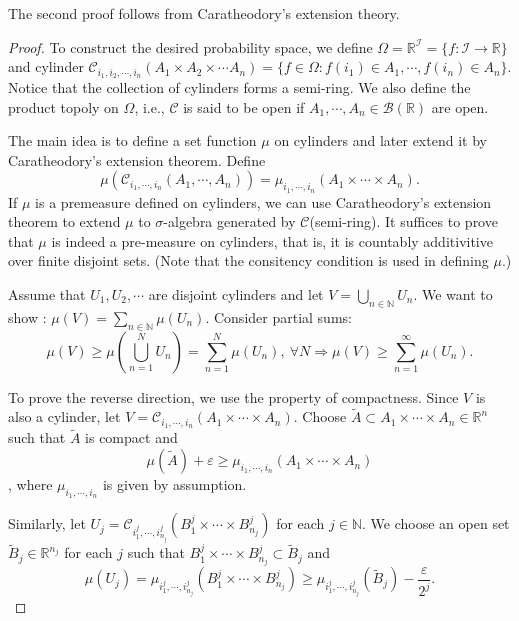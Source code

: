 \documentclass[11pt,english]{smfart}
\newcommand{\mb}{\mathbb}
\newcommand{\mc}{\mathcal}
\begin{document}
The second proof follows from Caratheodory's extension theory. 
\begin{proof}
    To construct the desired probability space, we define $\Omega = \mb{R}^{\mc{I}} = \{f: \mc{I} \rightarrow \mb{R}\}$ and cylinder \underline{$\mc{C}_{i_1,i_2,\cdots,i_n}(A_1\times A_2\times \cdots A_n) = \{f \in \Omega : f(i_1) \in A_1,\cdots, f(i_n) \in A_n\}$}. Notice that the collection of cylinders forms a semi-ring. We also define the product topoly on $\Omega$, i.e., $\mc{C}$ is said to be open if $A_1,\cdots,A_n\in\mc{B}(\mb{R})$ are open. 

    The main idea is to define a set function $\mu$ on cylinders and later extend it by Caratheodory's extension theorem. Define $$\mu\left(\mc{C}_{i_1,\cdots,i_n}(A_1,\cdots, A_n)\right) = \mu_{i_1,\cdots,i_n}(A_1\times \cdots\times A_n).$$  If $\mu$ is a premeasure defined on cylinders, we can use Caratheodory's extension theorem to extend $\mu$ to $\sigma$-algebra generated by $\mc{C}$(semi-ring). It suffices to prove that $\mu$ is indeed a pre-measure on cylinders, that is, it is countably additivitive over finite disjoint sets. (Note that the consitency condition is used in defining $\mu$.)

    Assume that $U_1,U_2,\cdots$ are disjoint cylinders and let $V =\bigcup_{n\in \mb{N}} U_n$. We want to show : $\mu(V) = \sum_{n\in \mb{N}} \mu(U_n)$. Consider partial sums: $$\mu(V) \geq \mu\left(\bigcup_{n=1}^N U_n\right) = \sum_{n=1}^N \mu(U_n), \ \forall N \Rightarrow \mu(V) \geq \sum_{n=1}^\infty \mu(U_n).$$

    To prove the reverse direction, we use the property of compactness. Since $V$ is also a cylinder, let $V = \mc{C}_{i_1,\cdots,i_n}(A_1\times \cdots \times A_n)$. Choose $\tilde{A} \subset A_1\times \cdots\times A_n\in \mb{R}^n$  such that $\tilde{A}$ is compact and $$\mu(\tilde{A}) + \varepsilon \geq \mu_{i_1,\cdots,i_n}(A_1\times \cdots \times A_n)$$, where $\mu_{i_1,\cdots,i_n}$ is given by assumption. 

    Similarly, let $U_j = \mc{C}_{{i_1^j},\cdots,i^j_{n_j}}(B^j_1\times \cdots \times B^j_{n_j})$ for each $j\in \mb{N}$. We choose an open set $\tilde{B}_j \in \mb{R}^{n_j}$ for each $j$ such that  $B^j_1\times \cdots \times B^j_{n_j} \subset \tilde{B}_j $ and $$\mu(U_j) = \mu_{i^j_1,\cdots,i^j_{n_j}}(B_1^j \times \cdots \times B_{n_j}^j) \geq \mu_{i^j_1,\cdots,i^j_{n_j}}(\tilde{B}_j) - \frac{\varepsilon}{2^j}.$$


\end{proof}
\end{document}
